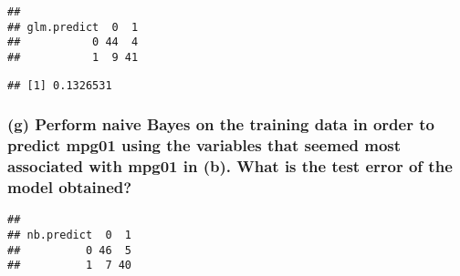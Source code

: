 \documentclass[
]{article}
\newenvironment{Shaded}{\begin{snugshade}}{\end{snugshade}}
\newcommand{\AttributeTok}[1]{\textcolor[rgb]{0.77,0.63,0.00}{#1}}
\newcommand{\FunctionTok}[1]{\textcolor[rgb]{0.00,0.00,0.00}{#1}}
\newcommand{\NormalTok}[1]{#1}
\newcommand{\OtherTok}[1]{\textcolor[rgb]{0.56,0.35,0.01}{#1}}
\newcommand{\SpecialCharTok}[1]{\textcolor[rgb]{0.00,0.00,0.00}{#1}}
\begin{document}
\begin{verbatim}
##            
## glm.predict  0  1
##           0 44  4
##           1  9 41
\end{verbatim}

\begin{Shaded}
\end{Shaded}

\begin{verbatim}
## [1] 0.1326531
\end{verbatim}

\hypertarget{g-perform-naive-bayes-on-the-training-data-in-order-to-predict-mpg01-using-the-variables-that-seemed-most-associated-with-mpg01-in-b.-what-is-the-test-error-of-the-model-obtained}{%
\subsubsection{(g) Perform naive Bayes on the training data in order to
predict mpg01 using the variables that seemed most associated with mpg01
in (b). What is the test error of the model
obtained?}\label{g-perform-naive-bayes-on-the-training-data-in-order-to-predict-mpg01-using-the-variables-that-seemed-most-associated-with-mpg01-in-b.-what-is-the-test-error-of-the-model-obtained}}

\begin{Shaded}
\end{Shaded}

\begin{verbatim}
##           
## nb.predict  0  1
##          0 46  5
##          1  7 40
\end{verbatim}

\begin{Shaded}
\end{Shaded}
\end{document}
